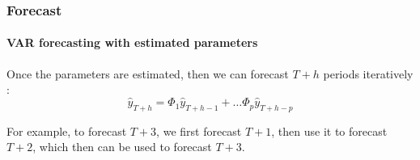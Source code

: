 \begin{frame}
    \frametitle{Forecast}
    \framesubtitle{VAR forecasting with estimated parameters}

    \begin{center} Once the parameters are estimated, then we can forecast $T+h$ periods iteratively \parencite[261]{ghysels_2018_applied}:
        $$\hat{y}_{T+h}=\Phi_1 \hat{y}_{T+h-1}+\ldots \Phi_p \hat{y}_{T+h-p}$$

        For example, to forecast $T+3$, we first forecast $T+1$, then use it to forecast $T+2$, which then can be used to forecast $T+3$. \end{center}

\end{frame}